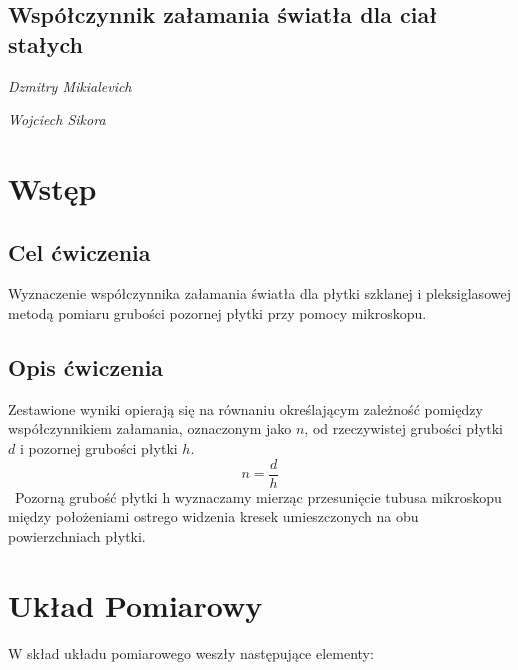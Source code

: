 \documentclass[]{article}
\begin{document}
\begin{figure}[tp!]
\end{figure}

\begin{center}
	\section*{Współczynnik załamania światła dla ciał stałych }
	\emph{Dzmitry Mikialevich}
\end{center}
\begin{center}
	\emph{Wojciech Sikora}
\end{center}
\tableofcontents
\newpage

\section{Wstęp}

\subsection{Cel ćwiczenia}
Wyznaczenie współczynnika załamania światła dla płytki szklanej i pleksiglasowej metodą
pomiaru grubości pozornej płytki przy pomocy mikroskopu. 

    
\subsection{Opis ćwiczenia}
Zestawione wyniki opierają się na równaniu określającym zależność pomiędzy współczynnikiem załamania, oznaczonym jako \(n\), od rzeczywistej grubości płytki \(d\) i pozornej grubości płytki \(h\).
\[n =\frac{d}{h}\] \
Pozorną grubość płytki h wyznaczamy mierząc przesunięcie tubusa mikroskopu między położeniami ostrego widzenia
kresek umieszczonych na obu powierzchniach płytki. 

    
\section{Układ Pomiarowy}
W skład układu pomiarowego weszły następujące elementy:
\newline
\end{document}
